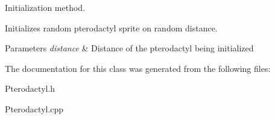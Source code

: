Initialization method. 

Initializes random pterodactyl sprite on random distance.


\begin{DoxyParams}{Parameters}
{\em distance} & Distance of the pterodactyl being initialized \\
\hline
\end{DoxyParams}


The documentation for this class was generated from the following files\+:\begin{DoxyCompactItemize}
\item 
Pterodactyl.\+h\item 
Pterodactyl.\+cpp\end{DoxyCompactItemize}
